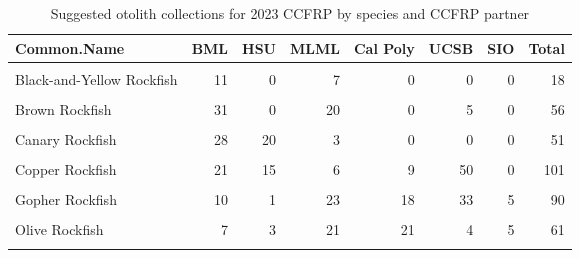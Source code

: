 \documentclass[
]{article}
\begin{document}
\begin{table}

\caption{\label{tab:collections}Suggested otolith collections for 2023 CCFRP by species and CCFRP partner}
\centering
\begin{tabular}[t]{lrrrrrrr}
\toprule
Common.Name & BML & HSU & MLML & Cal Poly & UCSB & SIO & Total\\
\midrule
\cellcolor{gray!6}{Black Rockfish} & \cellcolor{gray!6}{10} & \cellcolor{gray!6}{11} & \cellcolor{gray!6}{30} & \cellcolor{gray!6}{0} & \cellcolor{gray!6}{0} & \cellcolor{gray!6}{0} & \cellcolor{gray!6}{51}\\
Black-and-Yellow Rockfish & 11 & 0 & 7 & 0 & 0 & 0 & 18\\
\cellcolor{gray!6}{Blue Rockfish} & \cellcolor{gray!6}{10} & \cellcolor{gray!6}{3} & \cellcolor{gray!6}{23} & \cellcolor{gray!6}{15} & \cellcolor{gray!6}{50} & \cellcolor{gray!6}{0} & \cellcolor{gray!6}{101}\\
Brown Rockfish & 31 & 0 & 20 & 0 & 5 & 0 & 56\\
\cellcolor{gray!6}{Calico Rockfish} & \cellcolor{gray!6}{0} & \cellcolor{gray!6}{0} & \cellcolor{gray!6}{0} & \cellcolor{gray!6}{4} & \cellcolor{gray!6}{0} & \cellcolor{gray!6}{16} & \cellcolor{gray!6}{20}\\
\addlinespace
Canary Rockfish & 28 & 20 & 3 & 0 & 0 & 0 & 51\\
\cellcolor{gray!6}{China Rockfish} & \cellcolor{gray!6}{19} & \cellcolor{gray!6}{9} & \cellcolor{gray!6}{23} & \cellcolor{gray!6}{0} & \cellcolor{gray!6}{0} & \cellcolor{gray!6}{0} & \cellcolor{gray!6}{51}\\
Copper Rockfish & 21 & 15 & 6 & 9 & 50 & 0 & 101\\
\cellcolor{gray!6}{Deacon Rockfish} & \cellcolor{gray!6}{38} & \cellcolor{gray!6}{13} & \cellcolor{gray!6}{1} & \cellcolor{gray!6}{0} & \cellcolor{gray!6}{0} & \cellcolor{gray!6}{0} & \cellcolor{gray!6}{52}\\
Gopher Rockfish & 10 & 1 & 23 & 18 & 33 & 5 & 90\\
\addlinespace
\cellcolor{gray!6}{Kelp Rockfish} & \cellcolor{gray!6}{0} & \cellcolor{gray!6}{0} & \cellcolor{gray!6}{11} & \cellcolor{gray!6}{17} & \cellcolor{gray!6}{7} & \cellcolor{gray!6}{5} & \cellcolor{gray!6}{40}\\
Olive Rockfish & 7 & 3 & 21 & 21 & 4 & 5 & 61\\
\cellcolor{gray!6}{Quillback Rockfish} & \cellcolor{gray!6}{4} & \cellcolor{gray!6}{13} & \cellcolor{gray!6}{0} & \cellcolor{gray!6}{0} & \cellcolor{gray!6}{0} & \cellcolor{gray!6}{0} & \cellcolor{gray!6}{17}\\

\end{tabular}
\end{table}
\end{document}
